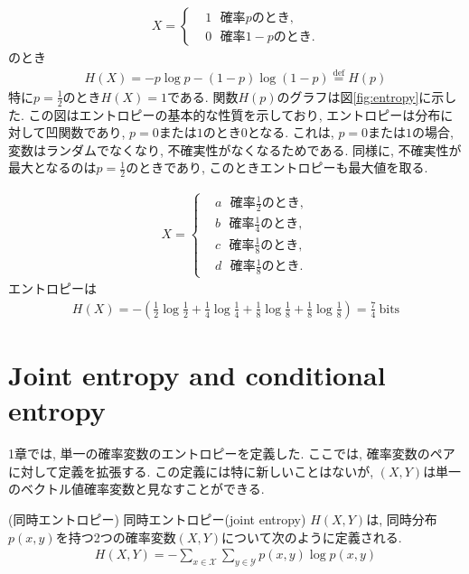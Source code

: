 \documentclass[a4j]{jsarticle}
\begin{document}
\begin{align}
	X = \begin{cases}
		     & 1\:\:\:\mbox{確率}p\mbox{のとき},   \\
		     & 0\:\:\:\mbox{確率}1-p\mbox{のとき}.
	    \end{cases}
\end{align}
のとき
\begin{align}
	H(X) = -p \log p - (1-p) \log (1-p) \stackrel{\mathrm{def}}{=} H(p)
\end{align}
特に$p = \frac{1}{2}$のとき$H(X) = 1$である. 関数$H(p)$のグラフは図\ref{fig:entropy}に示した. この図はエントロピーの基本的な性質を示しており, エントロピーは分布に対して凹関数であり, $p = 0$または$1$のとき$0$となる. これは, $p = 0$または$1$の場合, 変数はランダムでなくなり, 不確実性がなくなるためである. 同様に, 不確実性が最大となるのは$p = \frac{1}{2}$のときであり, このときエントロピーも最大値を取る.\\


\begin{align}
	X = \begin{cases}
		     & a\:\:\:\mbox{確率}\frac{1}{2}\mbox{のとき}, \\
		     & b\:\:\:\mbox{確率}\frac{1}{4}\mbox{のとき}, \\
		     & c\:\:\:\mbox{確率}\frac{1}{8}\mbox{のとき}, \\
		     & d\:\:\:\mbox{確率}\frac{1}{8}\mbox{のとき}.
	    \end{cases}
\end{align}
エントロピーは
\begin{align}
	H(X) = - \left( \frac{1}{2} \log \frac{1}{2} + \frac{1}{4} \log \frac{1}{4} + \frac{1}{8} \log \frac{1}{8} + \frac{1}{8} \log \frac{1}{8} \right) = \frac{7}{4} \: \mbox{bits}
\end{align}

\section{Joint entropy and conditional entropy}

1章では, 単一の確率変数のエントロピーを定義した. ここでは, 確率変数のペアに対して定義を拡張する. この定義には特に新しいことはないが, $(X, Y)$は単一のベクトル値確率変数と見なすことができる.\\

\begin{itembox}[l]{ (同時エントロピー)}
	同時エントロピー(joint entropy) $H(X, Y)$は, 同時分布$p(x, y)$を持つ2つの確率変数$(X, Y)$について次のように定義される.
	\begin{align}
		H(X, Y) = - \sum_{x \in \mathcal{X}} \sum_{y \in \mathcal{Y}} p(x, y) \log p(x, y)
	\end{align}
\end{itembox}\\
\end{document}
